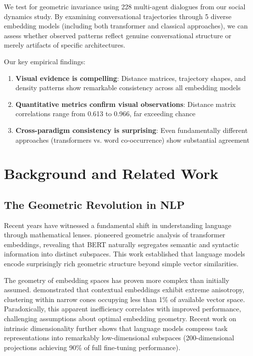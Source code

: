 \documentclass[11pt,letterpaper]{article}
\newcommand{\totalConversations}{228}
\newcommand{\numEmbeddingModels}{5}
\newcommand{\minPairwiseCorr}{0.613}
\newcommand{\maxPairwiseCorr}{0.966}
\begin{document}
We test for geometric invariance using \totalConversations{} multi-agent dialogues from our social dynamics study. By examining conversational trajectories through \numEmbeddingModels{} diverse embedding models (including both transformer and classical approaches), we can assess whether observed patterns reflect genuine conversational structure or merely artifacts of specific architectures.

Our key empirical findings:
\begin{enumerate}
\item \textbf{Visual evidence is compelling}: Distance matrices, trajectory shapes, and density patterns show remarkable consistency across all embedding models
\item \textbf{Quantitative metrics confirm visual observations}: Distance matrix correlations range from \minPairwiseCorr{} to \maxPairwiseCorr{}, far exceeding chance
\item \textbf{Cross-paradigm consistency is surprising}: Even fundamentally different approaches (transformers vs. word co-occurrence) show substantial agreement
\end{enumerate}

\section{Background and Related Work}

\subsection{The Geometric Revolution in NLP}

Recent years have witnessed a fundamental shift in understanding language through mathematical lenses. \citet{reif2019visualizing} pioneered geometric analysis of transformer embeddings, revealing that BERT naturally segregates semantic and syntactic information into distinct subspaces. This work established that language models encode surprisingly rich geometric structure beyond simple vector similarities.

The geometry of embedding spaces has proven more complex than initially assumed. \citet{ethayarajh2019contextual} demonstrated that contextual embeddings exhibit extreme anisotropy, clustering within narrow cones occupying less than 1\% of available vector space. Paradoxically, this apparent inefficiency correlates with improved performance, challenging assumptions about optimal embedding geometry. Recent work on intrinsic dimensionality \citep{aghajanyan2021intrinsic} further shows that language models compress task representations into remarkably low-dimensional subspaces (200-dimensional projections achieving 90\% of full fine-tuning performance).
\end{document}
